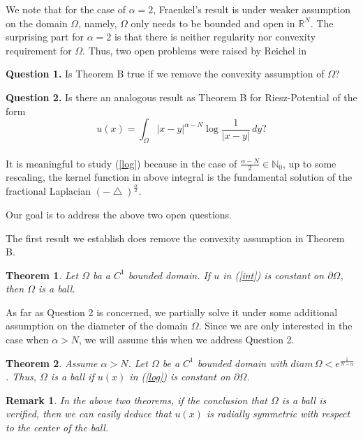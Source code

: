 \documentclass[12pt]{amsproc}
\theoremstyle{plain}
\numberwithin{equation}{section}
\newtheorem{mthm}{Theorem}
\newtheorem{rem}{Remark}[section]
\begin{document}
 We note that for the case of $\alpha=2$,  Fraenkel's result is under weaker assumption on the domain $\Omega$, namely, $\Omega$ only needs to be bounded and open in $\mathbb R^N$.
The surprising part for $\alpha=2$ is that there is neither
regularity nor convexity requirement for $\Omega$.  Thus, two open
problems were  raised by Reichel in \cite{R2}

{\bf Question 1.}  Is  Theorem B  true if we remove the convexity
assumption of $\Omega$?
\medskip

{\bf Question 2.} Is there an analogous result as Theorem B for
Riesz-Potential of the form
  \begin{equation}
  u(x)=\int_\Omega |x-y|^{\alpha-N}\log\frac{1}{|x-y|} \,dy?
  \label{log}
  \end{equation}\\
It is meaningful to study (\ref{log}) because in the case of
$\frac{\alpha-N}{2}\in \mathbb N_0$, up to some rescaling, the
kernel function in above integral is the fundamental solution of the
fractional Laplacian $(-{\mbox{$\bigtriangleup$}})^{\frac{\alpha}{2}}.$

Our goal is to address the above two open questions.

The first result we establish does remove the convexity assumption
in Theorem B.

\begin{mthm}
Let $\Omega$ ba a $C^1$ bounded domain. If $u$ in (\ref{int}) is
constant on $\partial\Omega$, then $\Omega$ is a ball. \label{1t}
\end{mthm}

 As far as Question 2 is concerned, we partially solve it under some additional assumption on the diameter of the domain $\Omega$. Since we are only interested in the case when $\alpha>N$, we will assume this when we address Question 2.

\begin{mthm}
Assume $\alpha>N$. Let $\Omega$ be a $C^1$ bounded domain with
$diam \,\Omega< e^{\frac{1}{N-\alpha}}$. Thus, $\Omega$ is a ball if
$u(x)$ in (\ref{log}) is constant on $\partial\Omega$. \label{2t}
\end{mthm}

\begin{rem}
In the above two theorems, if the conclusion that $\Omega$ is a ball
is verified, then we can easily deduce that $u(x)$ is radially
symmetric with respect to the center of the ball.
\end{rem}
\end{document}
